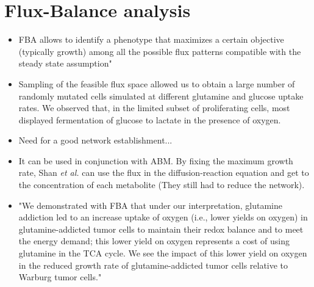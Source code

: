 \documentclass[11pt,a4paper]{article}
\begin{document}
\section{Flux-Balance analysis}
\begin{itemize}
\item FBA allows to identify a phenotype that maximizes a certain objective (typically growth) among all the possible flux patterns compatible with the steady state assumption"\cite{Damiani2017}
\item Sampling of the feasible flux space allowed us to obtain a large number of randomly mutated cells simulated at different glutamine and glucose uptake rates. We observed that, in the limited subset of proliferating cells, most displayed fermentation of glucose to lactate in the presence of oxygen.\cite{Damiani2017}
\item Need for a good network establishment...
\item It can be used in conjunction with ABM. By fixing the maximum  growth rate, Shan \textit{et al.} can use the flux in the diffusion-reaction equation and get to the concentration of each metabolite (They still had to reduce the network).\cite{Shan2018}
\item "We demonstrated with FBA that
under our interpretation, glutamine addiction led to an increase uptake of oxygen (i.e., lower
yields on oxygen) in glutamine-addicted tumor cells to maintain their redox balance and to
meet the energy demand; this lower yield on oxygen represents a cost of using glutamine in
the TCA cycle. We see the impact of this lower yield on oxygen in the reduced growth rate of
glutamine-addicted tumor cells relative to Warburg tumor cells."\cite{Shan2018}

\end{itemize}
\end{document}
